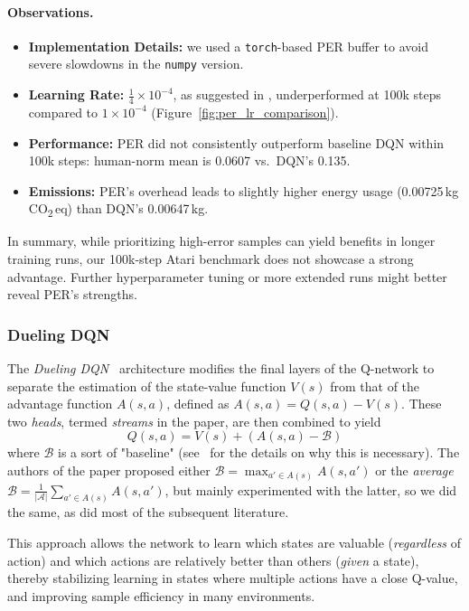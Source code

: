 \paragraph{Observations.}
\begin{itemize}
	\item \textbf{Implementation Details:} 
	we used a \texttt{torch}-based PER buffer to avoid severe slowdowns in the \texttt{numpy} version.
	\item \textbf{Learning Rate:} 
	$\tfrac{1}{4}\times10^{-4}$, as suggested in \cite{schaul:prioritized}, underperformed at 100k steps 
	compared to $1\times10^{-4}$ (Figure~\vref{fig:per_lr_comparison}).
	\item \textbf{Performance:} 
	PER did not consistently outperform baseline DQN within 100k steps: 
	human-norm mean is \num{0.0607} vs.\ DQN's \num{0.135}. 
	\item \textbf{Emissions:} 
	PER's overhead leads to slightly higher energy usage (\num{0.00725}\,kg\,CO\textsubscript{2}\,eq) than DQN's \num{0.00647}\,kg.
\end{itemize}

In summary, while prioritizing high-error samples can yield benefits in longer training runs, 
our 100k-step Atari benchmark does not showcase a strong advantage. 
Further hyperparameter tuning or more extended runs might better reveal PER's strengths.


\subsubsection{Dueling DQN}
\label{subsubsec:dueling_dqn}
The \emph{Dueling DQN}~\cite{wang:dueling} architecture modifies the final layers of the Q-network
to separate the estimation of the state-value function $V(s)$ from that of the advantage function $A(s,a)$,
defined as $A(s, a) = Q(s, a) - V(s)$.
These two \textit{heads}, termed \textit{streams} in the paper, are then combined to yield
$$
Q(s, a) = V(s) + (A(s, a) - \mathcal{B})
$$
where $\mathcal{B}$ is a sort of "baseline" (see~\cite{wang:dueling} for the details on why this is necessary). The authors of the paper proposed either $\mathcal{B} = \max_{a' \in A(s)} A(s, a')$ or the \textit{average} $\mathcal{B} = \frac{1}{|\mathcal{A}|}\sum_{a' \in A(s)} A(s, a')$, but mainly experimented with the latter, so we did the same, as did most of the subsequent literature.

This approach allows the network to learn which states are valuable 
(\emph{regardless} of action) and which actions are relatively better than others 
(\emph{given} a state), thereby stabilizing learning in states where multiple actions have a close Q-value, and improving sample efficiency 
in many environments.

